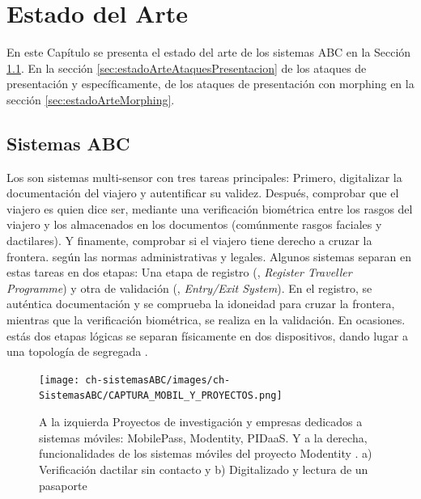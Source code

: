 \chapter{Estado del Arte\label{ch:EstadoDelArte}}

En este Capítulo se presenta el estado del arte de los sistemas \Gls{ABC} en la Sección \ref{sec:estadoArteABC}. En la sección \ref{sec:estadoArteAtaquesPresentacion} de los ataques de presentación y específicamente, de los ataques de presentación con \gls{morphing} en la sección \ref{sec:estadoArteMorphing}.

\section{Sistemas ABC}\label{sec:estadoArteABC}

Los  son sistemas multi-sensor con tres tareas principales: Primero, digitalizar la documentación del viajero y autentificar su validez. Después, comprobar que el viajero es quien dice ser, mediante una verificación biométrica entre los rasgos del viajero y los almacenados en los documentos (comúnmente rasgos faciales y dactilares). Y finamente, comprobar si el viajero tiene derecho a cruzar la frontera. según las normas administrativas y legales. Algunos sistemas \cite{didier2015eu} \cite{anand2016enhancing} \cite{del2016automated} \cite{Gorodnichy2015ARTinABC} separan en estas tareas en dos etapas: Una etapa de registro (, \textit{Register Traveller Programme}) y otra de validación (, \textit{Entry/Exit System}). En el registro, se auténtica documentación y se comprueba la idoneidad para cruzar la frontera, mientras que la verificación biométrica, se realiza en la validación. En ocasiones. estás dos etapas lógicas se separan físicamente en dos dispositivos, dando lugar a una topología de  segregada \cite{del2016automated}.

\begin{figure}[t]
    \centering
    \texttt{[image: ch-sistemasABC/images/ch-SistemasABC/CAPTURA\_MOBIL\_Y\_PROYECTOS.png]}
    \caption{A la izquierda Proyectos de investigación y empresas dedicados a sistemas móviles: \Gls{MobilePass}\cite{MobilePassOnline}, \Gls{Modentity}\cite{ModentityOnline}, \Gls{PIDaaS}\cite{PIDaaSOnline}. Y a la derecha, funcionalidades de los sistemas  móviles del proyecto \gls{Modentity} \cite{ModentityOnline}. a) Verificación dactilar sin contacto y b) Digitalizado y lectura  de un pasaporte}
    \label{fig:modentityFunciones}
\end{figure}

